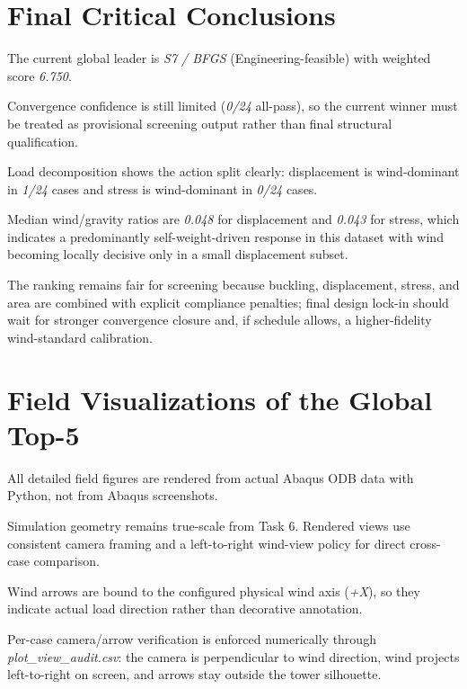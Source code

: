 \chapter{Final Critical Conclusions}


\noindent The current global leader is \textit{S7 / BFGS} (Engineering-feasible) with weighted score \textit{6.750}.

\noindent Convergence confidence is still limited (\textit{0/24} all-pass), so the current winner must be treated as provisional screening output rather than final structural qualification.

\noindent Load decomposition shows the action split clearly: displacement is wind-dominant in \textit{1/24} cases and stress is wind-dominant in \textit{0/24} cases.

\noindent Median wind/gravity ratios are \textit{0.048} for displacement and \textit{0.043} for stress, which indicates a predominantly self-weight-driven response in this dataset with wind becoming locally decisive only in a small displacement subset.

\noindent The ranking remains fair for screening because buckling, displacement, stress, and area are combined with explicit compliance penalties; final design lock-in should wait for stronger convergence closure and, if schedule allows, a higher-fidelity wind-standard calibration.


\chapter{Field Visualizations of the Global Top-5}


\noindent All detailed field figures are rendered from actual Abaqus ODB data with Python, not from Abaqus screenshots.

\noindent Simulation geometry remains true-scale from Task 6. Rendered views use consistent camera framing and a left-to-right wind-view policy for direct cross-case comparison.

\noindent Wind arrows are bound to the configured physical wind axis (\textit{+X}), so they indicate actual load direction rather than decorative annotation.

\noindent Per-case camera/arrow verification is enforced numerically through \textit{plot\_view\_audit.csv}: the camera is perpendicular to wind direction, wind projects left-to-right on screen, and arrows stay outside the tower silhouette.


